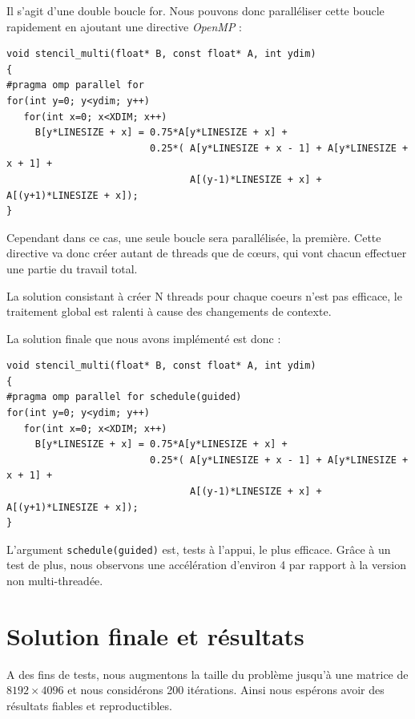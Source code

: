 \documentclass{article}
\begin{document}
Il s'agit d'une double boucle for.
Nous pouvons donc paralléliser cette boucle rapidement en ajoutant une directive \textit{OpenMP} :
\begin{verbatim}
void stencil_multi(float* B, const float* A, int ydim)
{
#pragma omp parallel for
for(int y=0; y<ydim; y++)
   for(int x=0; x<XDIM; x++)
     B[y*LINESIZE + x] = 0.75*A[y*LINESIZE + x] +
                         0.25*( A[y*LINESIZE + x - 1] + A[y*LINESIZE + x + 1] +
                                A[(y-1)*LINESIZE + x] + A[(y+1)*LINESIZE + x]);
}
\end{verbatim}
Cependant dans ce cas, une seule boucle sera parallélisée, la première.
Cette directive va donc créer autant de threads que de c\oe{}urs, qui vont chacun effectuer une partie du travail total.

La solution consistant à créer N threads pour chaque coeurs n'est pas efficace, le traitement global est ralenti à cause des changements de contexte.

La solution finale que nous avons implémenté est donc :
\begin{verbatim}
void stencil_multi(float* B, const float* A, int ydim)
{
#pragma omp parallel for schedule(guided)
for(int y=0; y<ydim; y++)
   for(int x=0; x<XDIM; x++)
     B[y*LINESIZE + x] = 0.75*A[y*LINESIZE + x] +
                         0.25*( A[y*LINESIZE + x - 1] + A[y*LINESIZE + x + 1] +
                                A[(y-1)*LINESIZE + x] + A[(y+1)*LINESIZE + x]);
}
\end{verbatim}

L'argument \verb+schedule(guided)+ est, tests à l'appui, le plus efficace.
Grâce à un test de plus, nous observons une accélération d'environ 4 par rapport à la version non multi-threadée.

\section{Solution finale et résultats}

A des fins de tests, nous augmentons la taille du problème jusqu'à une matrice de $8192\times4096$ et nous considérons 200 itérations.
Ainsi nous espérons avoir des résultats fiables et reproductibles.
\end{document}
